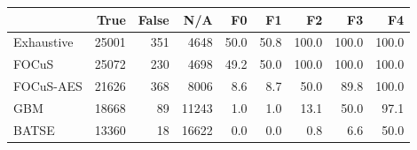 \begin{tabular}{lrrrrrrrr}
\toprule
 & True & False & N/A & F0 & F1 & F2 & F3 & F4 \\
\midrule
Exhaustive & 25001 & 351 & 4648 & 50.0 & 50.8 & 100.0 & 100.0 & 100.0 \\
FOCuS & 25072 & 230 & 4698 & 49.2 & 50.0 & 100.0 & 100.0 & 100.0 \\
FOCuS-AES & 21626 & 368 & 8006 & 8.6 & 8.7 & 50.0 & 89.8 & 100.0 \\
GBM & 18668 & 89 & 11243 & 1.0 & 1.0 & 13.1 & 50.0 & 97.1 \\
BATSE & 13360 & 18 & 16622 & 0.0 & 0.0 & 0.8 & 6.6 & 50.0 \\
\bottomrule
\end{tabular}

